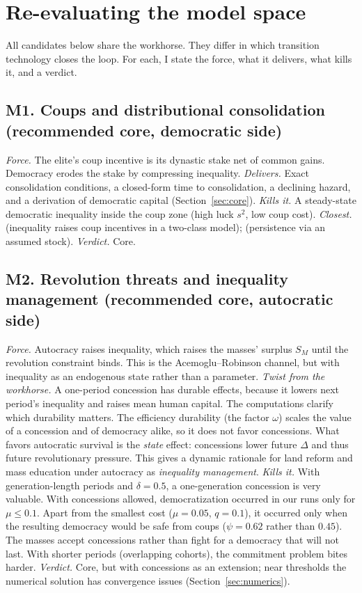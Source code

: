 \documentclass[11pt]{article}
\theoremstyle{remark}
\begin{document}
\section{Re-evaluating the model space}\label{sec:menu}

All candidates below share the workhorse.  They differ in which transition technology closes the loop.  For each, I state the force, what it delivers, what kills it, and a verdict.

\subsection{M1. Coups and distributional consolidation (recommended core, democratic side)}
\emph{Force.}  The elite's coup incentive is its dynastic stake net of common gains.  Democracy erodes the stake by compressing inequality.  \emph{Delivers.}  Exact consolidation conditions, a closed-form time to consolidation, a declining hazard, and a derivation of democratic capital (Section~\ref{sec:core}).  \emph{Kills it.}  A steady-state democratic inequality inside the coup zone (high luck $s^2$, low coup cost).  \emph{Closest.}  \citet{AcemogluRobinson2001} (inequality raises coup incentives in a two-class model); \citet{PerssonTabellini2009} (persistence via an assumed stock).  \emph{Verdict.}  Core.

\subsection{M2. Revolution threats and inequality management (recommended core, autocratic side)}
\emph{Force.}  Autocracy raises inequality, which raises the masses' surplus $S_M$ until the revolution constraint binds.  This is the Acemoglu--Robinson channel, but with inequality as an endogenous state rather than a parameter.  \emph{Twist from the workhorse.}  A one-period concession has durable effects, because it lowers next period's inequality and raises mean human capital.  The computations clarify which durability matters.  The efficiency durability (the factor $\omega$) scales the value of a concession and of democracy alike, so it does not favor concessions.  What favors autocratic survival is the \emph{state} effect: concessions lower future $\Delta$ and thus future revolutionary pressure.  This gives a dynamic rationale for land reform and mass education under autocracy \citep{Grossman1994,Albertus2015,Paglayan2021} as \emph{inequality management}.  \emph{Kills it.}  With generation-length periods and $\delta=0.5$, a one-generation concession is very valuable.  With concessions allowed, democratization occurred in our runs only for $\mu\le0.1$.  Apart from the smallest cost ($\mu=0.05$, $q=0.1$), it occurred only when the resulting democracy would be safe from coups ($\psi=0.62$ rather than $0.45$).  The masses accept concessions rather than fight for a democracy that will not last.  With shorter periods (overlapping cohorts), the commitment problem bites harder.  \emph{Verdict.}  Core, but with concessions as an extension; near thresholds the numerical solution has convergence issues (Section~\ref{sec:numerics}).
\end{document}
